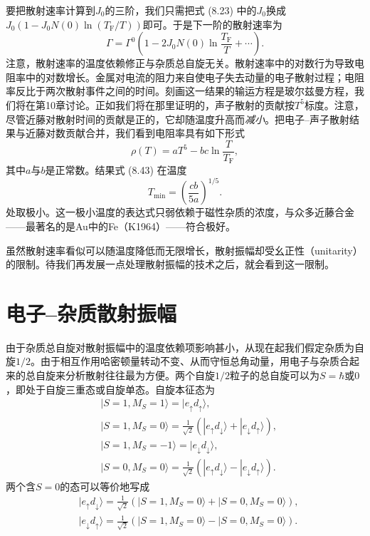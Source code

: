 要把散射速率计算到$J_0$的三阶，我们只需把式 (8.23) 中的$J_0$换成$J_0(1-J_0N(0)\ln(T_{\mathrm{F}}/T))$即可。于是下一阶的散射速率为
\begin{equation*}
\Gamma = \Gamma^0\left(1-2J_0N(0)\ln\frac{T_{\mathrm{F}}}{T}+\cdots\right).
\tag{8.42}
\end{equation*}
注意，散射速率的温度依赖修正与杂质总自旋无关。散射速率中的对数行为导致电阻率中的对数增长。金属对电流的阻力来自使电子失去动量的电子散射过程；电阻率反比于两次散射事件之间的时间。刻画这一结果的输运方程是玻尔兹曼方程，我们将在第10章讨论。正如我们将在那里证明的，声子散射的贡献按$T^5$标度。注意，尽管近藤对散射时间的贡献是正的，它却随温度升高而\emph{减小}。把电子–声子散射结果与近藤对数贡献合并，我们看到电阻率具有如下形式
\begin{equation*}
\rho(T) = aT^5 - bc\ln\frac{T}{T_{\mathrm{F}}},
\tag{8.43}
\end{equation*}
其中$a$与$b$是正常数。结果式 (8.43) 在温度
\begin{equation*}
T_{\mathrm{min}} = \left(\frac{cb}{5a}\right)^{1/5}.
\tag{8.44}
\end{equation*}
处取极小。这一极小温度的表达式只弱依赖于磁性杂质的浓度，与众多近藤合金——最著名的是Au中的Fe（K1964）——符合极好。

虽然散射速率看似可以随温度降低而无限增长，散射振幅却受幺正性（unitarity）的限制。待我们再发展一点处理散射振幅的技术之后，就会看到这一限制。

\section{电子–杂质散射振幅}

由于杂质总自旋对散射振幅中的温度依赖项影响甚小，从现在起我们假定杂质为自旋$1/2$。由于相互作用哈密顿量转动不变、从而守恒总角动量，用电子与杂质合起来的总自旋来分析散射往往最为方便。两个自旋$1/2$粒子的总自旋可以为$S=\hbar$或$0$，即处于自旋三重态或自旋单态。自旋本征态为
\begin{equation*}
\begin{aligned}
&|S=1,M_S=1\rangle = |e_{\uparrow}d_{\uparrow}\rangle,\\
&|S=1,M_S=0\rangle = \frac{1}{\sqrt{2}}\left(|e_{\uparrow}d_{\downarrow}\rangle+|e_{\downarrow}d_{\uparrow}\rangle\right),\\
&|S=1,M_S=-1\rangle = |e_{\downarrow}d_{\downarrow}\rangle,\\
&|S=0,M_S=0\rangle = \frac{1}{\sqrt{2}}\left(|e_{\uparrow}d_{\downarrow}\rangle-|e_{\downarrow}d_{\uparrow}\rangle\right).
\end{aligned}
\tag{8.45}
\end{equation*}
两个含$S=0$的态可以等价地写成
\begin{equation*}
\begin{aligned}
&|e_{\uparrow}d_{\downarrow}\rangle = \frac{1}{\sqrt{2}}\left(|S=1,M_S=0\rangle+|S=0,M_S=0\rangle\right),\\
&|e_{\downarrow}d_{\uparrow}\rangle = \frac{1}{\sqrt{2}}\left(|S=1,M_S=0\rangle-|S=0,M_S=0\rangle\right).
\end{aligned}
\tag{8.46}
\end{equation*}

